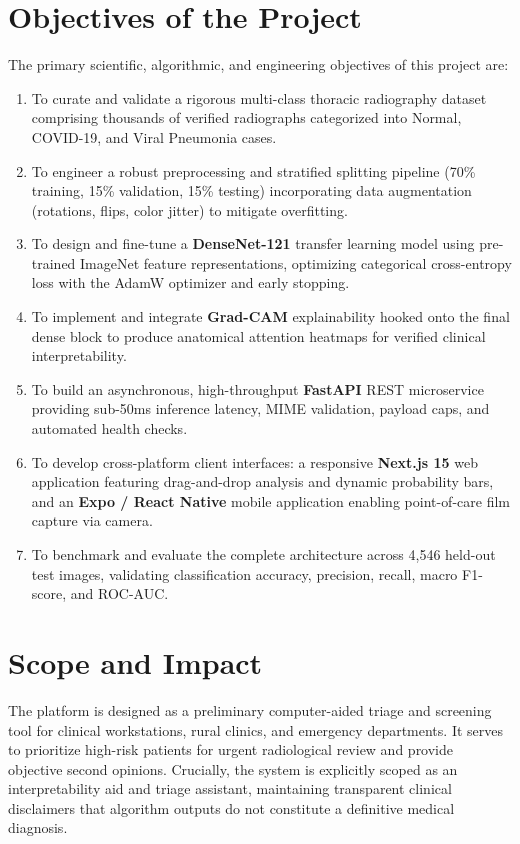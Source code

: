\documentclass[12pt,a4paper]{report}
\begin{document}
\section{Objectives of the Project}
The primary scientific, algorithmic, and engineering objectives of this project are:
\begin{enumerate}
    \item To curate and validate a rigorous multi-class thoracic radiography dataset comprising thousands of verified radiographs categorized into Normal, COVID-19, and Viral Pneumonia cases.
    \item To engineer a robust preprocessing and stratified splitting pipeline (70\% training, 15\% validation, 15\% testing) incorporating data augmentation (rotations, flips, color jitter) to mitigate overfitting.
    \item To design and fine-tune a \textbf{DenseNet-121} transfer learning model using pre-trained ImageNet feature representations, optimizing categorical cross-entropy loss with the AdamW optimizer and early stopping.
    \item To implement and integrate \textbf{Grad-CAM} explainability hooked onto the final dense block to produce anatomical attention heatmaps for verified clinical interpretability.
    \item To build an asynchronous, high-throughput \textbf{FastAPI} REST microservice providing sub-50ms inference latency, MIME validation, payload caps, and automated health checks.
    \item To develop cross-platform client interfaces: a responsive \textbf{Next.js 15} web application featuring drag-and-drop analysis and dynamic probability bars, and an \textbf{Expo / React Native} mobile application enabling point-of-care film capture via camera.
    \item To benchmark and evaluate the complete architecture across 4,546 held-out test images, validating classification accuracy, precision, recall, macro F1-score, and ROC-AUC.
\end{enumerate}

\section{Scope and Impact}
The platform is designed as a preliminary computer-aided triage and screening tool for clinical workstations, rural clinics, and emergency departments. It serves to prioritize high-risk patients for urgent radiological review and provide objective second opinions. Crucially, the system is explicitly scoped as an interpretability aid and triage assistant, maintaining transparent clinical disclaimers that algorithm outputs do not constitute a definitive medical diagnosis.
\end{document}

